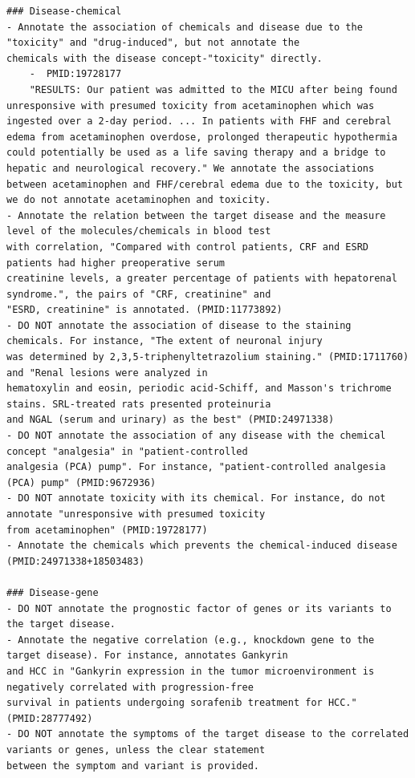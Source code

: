 \begin{lstlisting}
### Disease-chemical
- Annotate the association of chemicals and disease due to the "toxicity" and "drug-induced", but not annotate the
chemicals with the disease concept-"toxicity" directly.
    -  PMID:19728177
    "RESULTS: Our patient was admitted to the MICU after being found unresponsive with presumed toxicity from acetaminophen which was ingested over a 2-day period. ... In patients with FHF and cerebral edema from acetaminophen overdose, prolonged therapeutic hypothermia could potentially be used as a life saving therapy and a bridge to hepatic and neurological recovery." We annotate the associations between acetaminophen and FHF/cerebral edema due to the toxicity, but we do not annotate acetaminophen and toxicity.
- Annotate the relation between the target disease and the measure level of the molecules/chemicals in blood test
with correlation, "Compared with control patients, CRF and ESRD patients had higher preoperative serum
creatinine levels, a greater percentage of patients with hepatorenal syndrome.", the pairs of "CRF, creatinine" and
"ESRD, creatinine" is annotated. (PMID:11773892)
- DO NOT annotate the association of disease to the staining chemicals. For instance, "The extent of neuronal injury
was determined by 2,3,5-triphenyltetrazolium staining." (PMID:1711760) and "Renal lesions were analyzed in
hematoxylin and eosin, periodic acid-Schiff, and Masson's trichrome stains. SRL-treated rats presented proteinuria
and NGAL (serum and urinary) as the best" (PMID:24971338)
- DO NOT annotate the association of any disease with the chemical concept "analgesia" in "patient-controlled
analgesia (PCA) pump". For instance, "patient-controlled analgesia (PCA) pump" (PMID:9672936)
- DO NOT annotate toxicity with its chemical. For instance, do not annotate "unresponsive with presumed toxicity
from acetaminophen" (PMID:19728177)
- Annotate the chemicals which prevents the chemical-induced disease (PMID:24971338+18503483)

### Disease-gene
- DO NOT annotate the prognostic factor of genes or its variants to the target disease.
- Annotate the negative correlation (e.g., knockdown gene to the target disease). For instance, annotates Gankyrin
and HCC in "Gankyrin expression in the tumor microenvironment is negatively correlated with progression-free
survival in patients undergoing sorafenib treatment for HCC." (PMID:28777492)
- DO NOT annotate the symptoms of the target disease to the correlated variants or genes, unless the clear statement
between the symptom and variant is provided.


\end{lstlisting}
